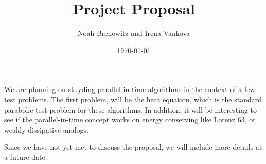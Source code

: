 \documentclass{article}
\title{Project Proposal}
\author{Noah Brenowitz and Irena Vankova}
\date{\today}
\begin{document}
\maketitle

We are planning on stuyding parallel-in-time algorithms in the context
of a few test problems. The first problem, will be the heat equation,
which is the standard parabolic test problem for these algorithms. In
addition, it will be interesting to see if the parallel-in-time
concept works on energy conserving like Lorenz 63, or weakly
dissipative analogs.

Since we have not yet met to discuss the proposal, we will include
more details at a future date.
\end{document}

